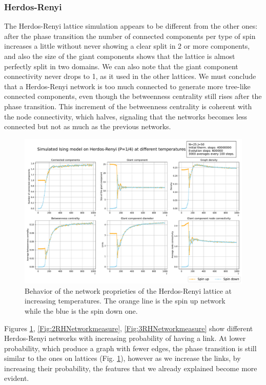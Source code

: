 \subsubsection*{Herdos-Renyi}
The Herdos-Renyi lattice simulation appears to be different from the other ones: after the phase transition the number of connected components per type of spin increases a little without never showing a clear split in 2 or more components, and also the size of the giant components shows that the lattice is almost perfectly split in two domains. We can also note that the giant component connectivity never drops to 1, as it used in the other lattices. We must conclude that a Herdos-Renyi network is too much connected to generate more tree-like connected components, even though the betweenness centrality still rises after the phase transition. This increment of the betweenness centrality is coherent with the node connectivity, which halves, signaling that the networks becomes less connected but not as much as the previous networks.  
\begin{figure}[!htb]
  \includegraphics[width=\linewidth]{Network meausres/HR.25_Network.pdf}
    \caption{Behavior of the network proprieties of the Herdos-Renyi lattice at increasing temperatures. The orange line is the spin up network while the blue is the spin down one.}
    \label{Fig:1RHNetworkmeasure}
\end{figure}
Figures \ref{Fig:1RHNetworkmeasure}, \ref{Fig:2RHNetworkmeasure}, \ref{Fig:3RHNetworkmeasure} show different Herdos-Renyi networks with increasing probability of having a link. At lower probability, which produce a graph with fewer edges, the phase transition is still similar to the ones on lattices (Fig. \ref{Fig:1RHNetworkmeasure}), however as we increase the links, by increasing their probability, the features that we already explained become more evident. 

